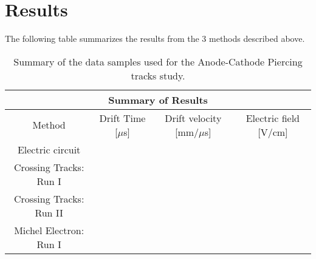\section{Results}\label{sec:Results}
The following table summarizes the results from the 3 methods described above.
\begin{center}
\begin{table}[htb]
  \begin{center}
    \begin{tabular}{c|c|c|c}
      \multicolumn{4}{c}{\textbf{Summary of Results}} \\
      \hline \hline
       Method & Drift Time [$\mu$s] & Drift velocity [mm/$\mu$s]  & Electric field [V/cm]\\
       \hline
       Electric circuit        &  & \\
       \hline
       Crossing Tracks: Run I  &  & \\
       \hline
       Crossing Tracks: Run II &  & \\
       \hline
       Michel Electron: Run I  &  & \\
       \hline
       \end{tabular}%
    \caption{Summary of the data samples used for the Anode-Cathode Piercing tracks study. }
    \label{tab:samples}
    \end{center}
\end{table}
\end{center}
